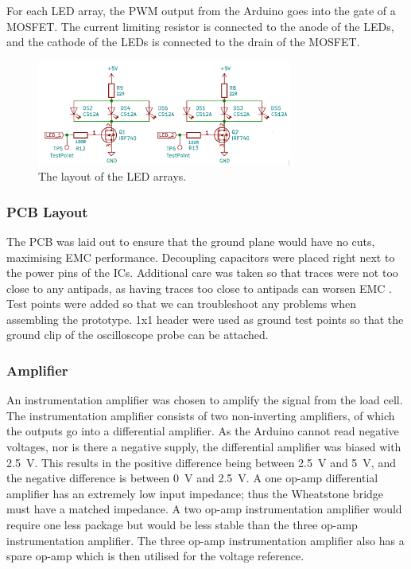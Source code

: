 \documentclass[twoside]{article}
\begin{document}
        For each LED array, the PWM output from the Arduino goes into the gate of a MOSFET. The current limiting resistor is connected to the anode of the LEDs, and the cathode of the LEDs is connected to the drain of the MOSFET.
        \noindent
        \begin{figure}[H]
            \centering
            \includegraphics[width=0.75\textwidth]{ledarray.png}
            \caption{The layout of the LED arrays.}
            \label{fig:led}
        \end{figure}

        \subsubsection{PCB Layout}
        The PCB was laid out to ensure that the ground plane would have no cuts, maximising EMC performance. Decoupling capacitors were placed right next to the power pins of the ICs. Additional care was taken so that traces were not too close to any antipads, as having traces too close to antipads can worsen EMC \cite{emc}. Test points were added so that we can troubleshoot any problems when assembling the prototype. 1x1 header were used as ground test points so that the ground clip of the oscilloscope probe can be attached.

        \subsubsection{Amplifier}
        An instrumentation amplifier was chosen to amplify the signal from the load cell. The instrumentation amplifier consists of two non-inverting amplifiers, of which the outputs go into a differential amplifier. As the Arduino cannot read negative voltages, nor is there a negative supply, the differential amplifier was biased with \SI{2.5}{\volt}. This results in the positive difference being between \SI{2.5}{\volt} and \SI{5}{\volt}, and the negative difference is between \SI{0}{\volt} and \SI{2.5}{\volt}. A one op-amp differential amplifier has an extremely low input impedance; thus the Wheatstone bridge must have a matched impedance. A two op-amp instrumentation amplifier would require one less package but would be less stable than the three op-amp instrumentation amplifier. The three op-amp instrumentation amplifier also has a spare op-amp which is then utilised for the voltage reference.
\end{document}
